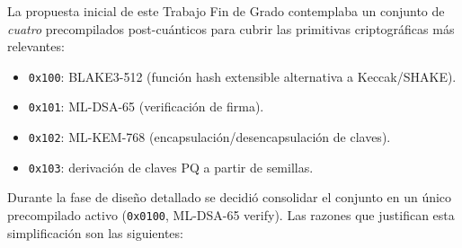 La propuesta inicial de este Trabajo Fin de Grado contemplaba un conjunto de \emph{cuatro} precompilados post-cuánticos para cubrir las primitivas criptográficas más relevantes:

\begin{itemize}
  \item \texttt{0x100}: BLAKE3-512 (función hash extensible alternativa a Keccak/SHAKE).
  \item \texttt{0x101}: ML-DSA-65 (verificación de firma).
  \item \texttt{0x102}: ML-KEM-768 (encapsulación/desencapsulación de claves).
  \item \texttt{0x103}: derivación de claves PQ a partir de semillas.
\end{itemize}

Durante la fase de diseño detallado se decidió consolidar el conjunto en un único precompilado activo (\texttt{0x0100}, ML-DSA-65 verify). Las razones que justifican esta simplificación son las siguientes:

